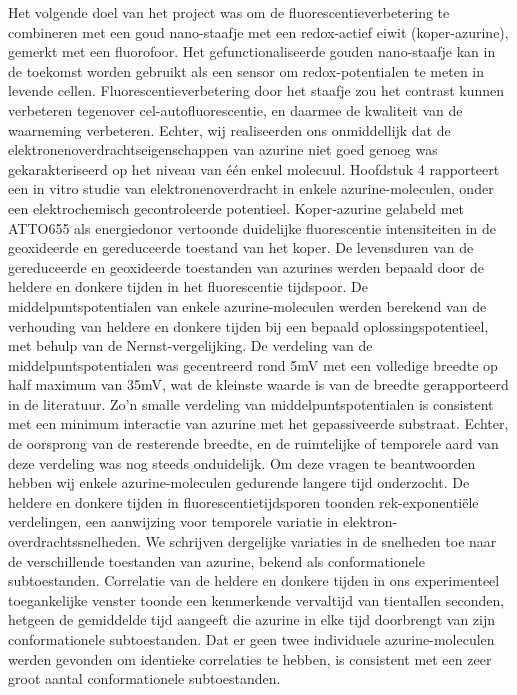 Het volgende doel van het project was om de fluorescentieverbetering te combineren met een goud nano-staafje met een redox-actief eiwit (koper-azurine), gemerkt met een fluorofoor. Het gefunctionaliseerde gouden nano-staafje kan in de toekomst worden gebruikt als een sensor om redox-potentialen te meten in levende cellen. Fluorescentieverbetering door het staafje zou het contrast kunnen verbeteren tegenover cel-autofluorescentie, en daarmee de kwaliteit van de waarneming verbeteren. Echter, wij realiseerden ons onmiddellijk dat de elektronenoverdrachtseigenschappen van azurine niet goed genoeg was gekarakteriseerd op het niveau van één enkel molecuul. Hoofdstuk 4 rapporteert een in vitro studie van elektronenoverdracht in enkele azurine-moleculen, onder een elektrochemisch gecontroleerde potentieel. Koper-azurine gelabeld met ATTO655 als energiedonor vertoonde duidelijke fluorescentie intensiteiten in de geoxideerde en gereduceerde toestand van het koper. De levensduren van de gereduceerde en geoxideerde toestanden van azurines werden bepaald door de heldere en donkere tijden in het fluorescentie tijdspoor. De middelpuntspotentialen van enkele azurine-moleculen werden berekend van de verhouding van heldere en donkere tijden bij een bepaald oplossingspotentieel, met behulp van de Nernst-vergelijking. De verdeling van de middelpuntspotentialen was gecentreerd rond 5mV met een volledige breedte op
half maximum van 35mV, wat de kleinste waarde is van de breedte gerapporteerd in de
literatuur. Zo'n smalle verdeling van middelpuntspotentialen is consistent met een minimum interactie van azurine met het gepassiveerde substraat. Echter, de oorsprong van de resterende breedte, en de ruimtelijke of temporele aard van deze verdeling was nog steeds onduidelijk. Om deze vragen te beantwoorden hebben wij enkele azurine-moleculen gedurende langere tijd onderzocht. De heldere en donkere tijden in fluorescentietijdsporen toonden rek-exponentiële verdelingen, een aanwijzing voor temporele variatie in elektron-overdrachtssnelheden. We schrijven dergelijke variaties in de snelheden toe naar de verschillende toestanden van azurine, bekend als conformationele subtoestanden. Correlatie van de heldere en donkere tijden in ons experimenteel toegankelijke venster toonde een kenmerkende vervaltijd van tientallen seconden, hetgeen de gemiddelde tijd aangeeft die azurine in elke tijd doorbrengt van zijn conformationele subtoestanden. Dat er geen twee individuele azurine-moleculen werden gevonden om identieke correlaties te hebben, is consistent met een zeer groot aantal conformationele subtoestanden.
